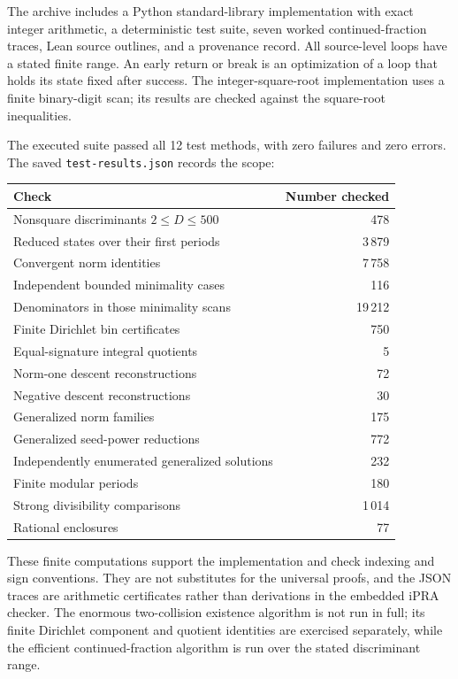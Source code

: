 \documentclass[11pt,letterpaper]{article}
\theoremstyle{definition}
\newcommand{\code}[1]{\texttt{#1}}
\begin{document}
The archive includes a Python standard-library implementation with exact
integer arithmetic, a deterministic test suite, seven worked
continued-fraction traces, Lean source outlines, and a provenance record.
All source-level loops have a stated finite range. An early return or break
is an optimization of a loop that holds its state fixed after success.
The integer-square-root implementation uses a finite binary-digit scan;
its results are checked against the square-root inequalities.

The executed suite passed all 12 test methods, with zero failures and
zero errors. The saved \code{test-results.json} records the scope:
\begin{center}
\small
\begin{tabular}{lr}
\toprule
Check & Number checked\\
\midrule
Nonsquare discriminants $2\le D\le500$ & 478\\
Reduced states over their first periods & 3\,879\\
Convergent norm identities & 7\,758\\
Independent bounded minimality cases & 116\\
Denominators in those minimality scans & 19\,212\\
Finite Dirichlet bin certificates & 750\\
Equal-signature integral quotients & 5\\
Norm-one descent reconstructions & 72\\
Negative descent reconstructions & 30\\
Generalized norm families & 175\\
Generalized seed-power reductions & 772\\
Independently enumerated generalized solutions & 232\\
Finite modular periods & 180\\
Strong divisibility comparisons & 1\,014\\
Rational enclosures & 77\\
\bottomrule
\end{tabular}
\end{center}

These finite computations support the implementation and check indexing
and sign conventions. They are not substitutes for the universal proofs,
and the JSON traces are arithmetic certificates rather than derivations in
the embedded iPRA checker. The enormous two-collision existence algorithm
is not run in full; its finite Dirichlet component and quotient identities
are exercised separately, while the efficient continued-fraction algorithm
is run over the stated discriminant range.
\end{document}
